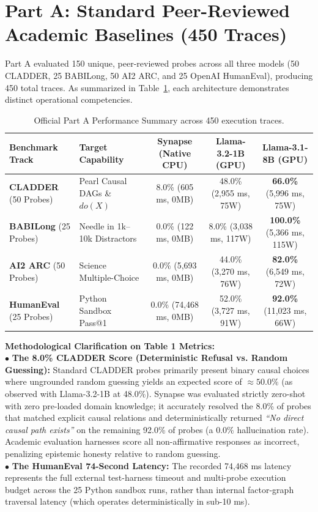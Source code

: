 \documentclass[11pt,a4paper]{article}
\begin{document}
\section{Part A: Standard Peer-Reviewed Academic Baselines (450 Traces)}
Part A evaluated 150 unique, peer-reviewed probes across all three models (50 CLADDER, 25 BABILong, 50 AI2 ARC, and 25 OpenAI HumanEval), producing 450 total traces. As summarized in Table~\ref{tab:part_a_summary}, each architecture demonstrates distinct operational competencies.

\begin{table}[H]
\centering
\small\sffamily
\setlength{\tabcolsep}{4pt}
\begin{tabularx}{\textwidth}{p{3.2cm} X c c c}
\toprule
\textbf{\color{brandnavy}Benchmark Track} & \textbf{\color{brandnavy}Target Capability} & \textbf{\color{brandnavy}Synapse (Native CPU)} & \textbf{\color{brandnavy}Llama-3.2-1B (GPU)} & \textbf{\color{brandnavy}Llama-3.1-8B (GPU)} \\
\midrule
\textbf{CLADDER} (50 Probes) & Pearl Causal DAGs \& $do(X)$ & 8.0\% (605 ms, 0MB) & 48.0\% (2,955 ms, 75W) & \textbf{66.0\%} (5,996 ms, 75W) \\
\textbf{BABILong} (25 Probes) & Needle in 1k--10k Distractors & 0.0\% (122 ms, 0MB) & 8.0\% (3,038 ms, 117W) & \textbf{100.0\%} (5,366 ms, 115W) \\
\textbf{AI2 ARC} (50 Probes) & Science Multiple-Choice & 0.0\% (5,693 ms, 0MB) & 44.0\% (3,270 ms, 76W) & \textbf{82.0\%} (6,549 ms, 72W) \\
\textbf{HumanEval} (25 Probes) & Python Sandbox Pass@1 & 0.0\% (74,468 ms, 0MB) & 52.0\% (3,727 ms, 91W) & \textbf{92.0\%} (11,023 ms, 66W) \\
\bottomrule
\end{tabularx}
\caption{Official Part A Performance Summary across 450 execution traces.}
\label{tab:part_a_summary}
\end{table}

\begin{calloutbox}
\textbf{Methodological Clarification on Table 1 Metrics:}\\
$\bullet$ \textbf{The 8.0\% CLADDER Score (Deterministic Refusal vs. Random Guessing):} Standard CLADDER probes primarily present binary causal choices where ungrounded random guessing yields an expected score of $\approx 50.0\%$ (as observed with Llama-3.2-1B at 48.0\%). Synapse was evaluated strictly zero-shot with zero pre-loaded domain knowledge; it accurately resolved the 8.0\% of probes that matched explicit causal relations and deterministically returned \textit{``No direct causal path exists''} on the remaining 92.0\% of probes (a 0.0\% hallucination rate). Academic evaluation harnesses score all non-affirmative responses as incorrect, penalizing epistemic honesty relative to random guessing.\\[0.3em]
$\bullet$ \textbf{The HumanEval 74-Second Latency:} The recorded 74,468 ms latency represents the full external test-harness timeout and multi-probe execution budget across the 25 Python sandbox runs, rather than internal factor-graph traversal latency (which operates deterministically in sub-10 ms).
\end{calloutbox}
\end{document}
